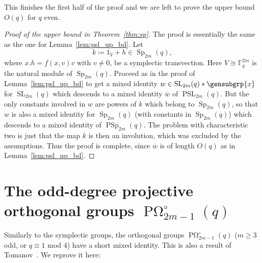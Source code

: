 \documentclass[a4paper,11pt]{amsproc}
\newcommand{\finfield}{\mathbb{F}}%
\DeclareMathOperator{\Sp}{Sp}%
\DeclareMathOperator{\PSp}{PSp}%
\DeclareMathOperator{\POmega}{P\Omega}
\DeclareMathOperator{\SL}{SL}%
\DeclareMathOperator{\PSL}{PSL}%
\theoremstyle{plain}
\theoremstyle{definition}
\begin{document}
	This finishes the first half of the proof and we are left to prove the upper bound $O(q)$ for $q$ even.
	\begin{proof}[Proof of the upper bound in Theorem~\ref{thm:sp}]
		The proof is essentially the same as the one for Lemma~\ref{lem:psl_up_bd}.
		Let 
		$$
		k\coloneqq 1_V+h\in\Sp_{2m}(q),
		$$ 
		where $x.h=f(x,v)v$ with $v\neq 0$, be a symplectic transvection. Here $V\cong\finfield_q^{2m}$ is the natural module of $\Sp_{2m}(q)$. Proceed as in the proof of Lemma~\ref{lem:psl_up_bd} to get a mixed identity $w\in\SL_{2m}(q)\ast\gensubgrp{x}$ for $\SL_{2m}(q)$ which descends to a mixed identity $\overline{w}$ of $\PSL_{2m}(q)$. But the only constants involved in $w$ are powers of $k$ which belong to $\Sp_{2m}(q)$, so that $w$ is also a mixed identity for $\Sp_{2m}(q)$ (with constants in $\Sp_{2m}(q)$) which descends to a mixed identity of $\PSp_{2m}(q)$. The problem with characteristic two is just that the map $k$ is then an involution, which was excluded by the assumptions. Thus the proof is complete, since $\overline{w}$ is of length $O(q)$ as in Lemma~\ref{lem:psl_up_bd}.
	\end{proof}
	
	\section{The odd-degree projective orthogonal groups \texorpdfstring{$\POmega^\circ_{2m-1}(q)$}{POmega2m-1q}} \label{OddOrthSect}
	
	Similarly to the symplectic groups, the orthogonal groups $\POmega^\circ_{2m-1}(q)$ ($m\geq3$ odd, or $q\equiv 1$ mod $4$) have a short mixed identity. This is also a result of Tomanov~\cite{tomanov1985generalized}. We reprove it here:
	
\end{document}
